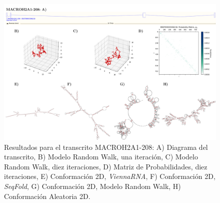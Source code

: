 \documentclass[a4paper,11pt,titlepage]{article}
\theoremstyle{definition}
\begin{document}
\begin{figure}[H]
    \centering
    \includegraphics[width=\textwidth]{images/MACROH2A1-208_full.png}
    \small{\caption{Resultados para el transcrito MACROH2A1-208: A) Diagrama del transcrito, B) Modelo Random Walk, una iteración, C) Modelo Random Walk, diez iteraciones, D) Matriz de Probabilidades, diez iteraciones, E) Conformación 2D, \textit{ViennaRNA}, F) Conformación 2D, \textit{SeqFold}, G) Conformación 2D, Modelo Random Walk, H) Conformación Aleatoria 2D.}}\normalsize
    \label{fig:MACROH2A1-208-diag}
\end{figure}
\end{document}
